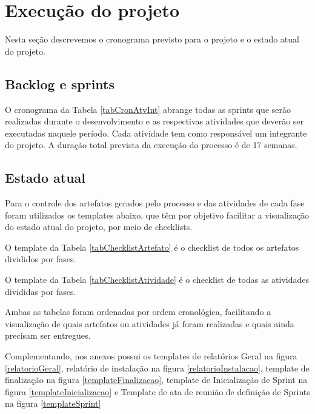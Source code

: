 \documentclass[	DIV=calc,%
							paper=a4,%
							fontsize=12pt,%
							onecolumn]{scrartcl}%
\begin{document}

\FloatBarrier

\section{Execução do projeto}

Nesta seção descrevemos o cronograma previsto para o projeto e o estado atual do projeto.

\subsection{Backlog e sprints}
O cronograma da Tabela \ref{tabCronAtvInt} abrange todas as sprints que serão realizadas durante o desenvolvimento e as respectivas atividades que deverão ser executadas naquele período. Cada atividade tem como responsável um integrante do projeto. A duração total prevista da execução do processo é de 17 semanas.


\FloatBarrier

\subsection{Estado atual}
Para o controle dos artefatos gerados pelo processo e das atividades de cada fase foram utilizados os templates abaixo, que têm por objetivo facilitar a visualização do estado atual do projeto, por meio de checklists.

O template da Tabela \ref{tabChecklistArtefato} é o checklist de todos os artefatos divididos por fases.

O template da Tabela \ref{tabChecklistAtividade} é o checklist de todas as atividades divididas por fases.

Ambas as tabelas foram ordenadas por ordem cronológica, facilitando a visualização de quais artefatos ou atividades já foram realizadas e quais ainda precisam ser entregues.


\FloatBarrier


\FloatBarrier

Complementando, nos anexos possui os templates de relatórios Geral na figura \ref{relatorioGeral}, relatório de instalação na figura \ref{relatorioInstalacao},
template de finalização na figura \ref{templateFinalizacao}, template de Inicialização de Sprint na figura \ref{templateInicializacao} e Template de ata de reunião de definição de Sprints na figura \ref{templateSprint}
\end{document}
